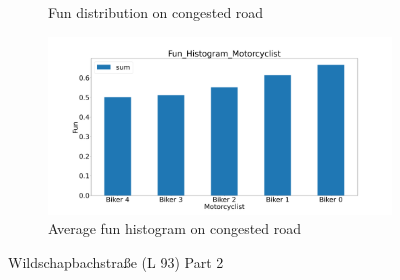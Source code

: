 \begin{figure}[H]
\begin{subfigure}[b]{0.45\textwidth}
		\caption{Fun distribution on congested road}
	\end{subfigure}
	\hfill
	\begin{subfigure}[b]{0.45\textwidth}
		\centering
		\includegraphics[width=1.0\textwidth]{images/Wildschapbachstrase/Wildschapbachstrase_Fun_Histogram_congested.png}
		\caption{Average fun histogram on congested road}
	\end{subfigure}
	\caption{Wildschapbachstraße (L 93) Part 2}
\end{figure}

